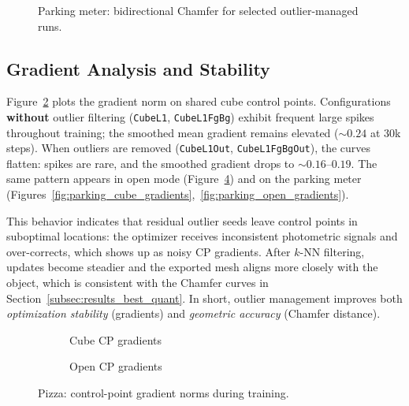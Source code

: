 \documentclass{report}
\begin{document}
\begin{figure}[H]
    \centering
    \caption{Parking meter: bidirectional Chamfer for selected outlier-managed runs.}
    \label{fig:parking_best_chamfer_bid}
\end{figure}

\subsection{Gradient Analysis and Stability}
\label{subsec:results_best_grad}

Figure~\ref{fig:pizza_cube_gradients} plots the gradient norm on shared cube control points. Configurations \textbf{without} outlier filtering (\texttt{CubeL1}, \texttt{CubeL1FgBg}) exhibit frequent large spikes throughout training; the smoothed mean gradient remains elevated ($\sim 0.24$ at 30k steps). When outliers are removed (\texttt{CubeL1Out}, \texttt{CubeL1FgBgOut}), the curves flatten: spikes are rare, and the smoothed gradient drops to $\sim 0.16$--$0.19$. The same pattern appears in open mode (Figure~\ref{fig:pizza_open_gradients}) and on the parking meter (Figures~\ref{fig:parking_cube_gradients},~\ref{fig:parking_open_gradients}).

This behavior indicates that residual outlier seeds leave control points in suboptimal locations: the optimizer receives inconsistent photometric signals and over-corrects, which shows up as noisy CP gradients. After $k$-NN filtering, updates become steadier and the exported mesh aligns more closely with the object, which is consistent with the Chamfer curves in Section~\ref{subsec:results_best_quant}. In short, outlier management improves both \emph{optimization stability} (gradients) and \emph{geometric accuracy} (Chamfer distance).

\begin{figure}[H]
    \centering
    \begin{subfigure}[t]{0.49\textwidth}
        \centering
        \caption{Cube CP gradients}
        \label{fig:pizza_cube_gradients}
    \end{subfigure}
    \hfill
    \begin{subfigure}[t]{0.49\textwidth}
        \centering
        \caption{Open CP gradients}
        \label{fig:pizza_open_gradients}
    \end{subfigure}
    \caption{Pizza: control-point gradient norms during training.}
\end{figure}
\end{document}
